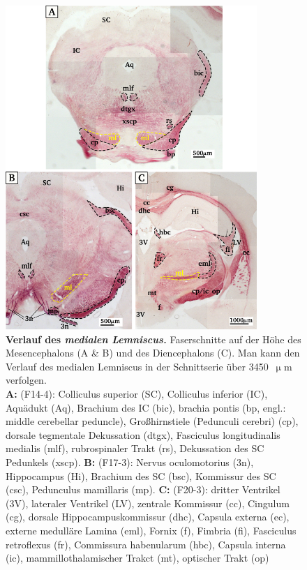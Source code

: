 \begin{figure}[H]
    \centering
    \includegraphics[width = 0.85\textwidth] {pictures/somatosensory/medial_lemniscus.png}
    \caption[Verlauf des medialen Lemniscus]{\small{\textbf{Verlauf des \textit{medialen Lemniscus.}} Faserschnitte auf der Höhe des Mesencephalons (A \& B) und des Diencephalons (C). Man kann den Verlauf des medialen Lemniscus in der Schnittserie über 3450~$\upmu$m verfolgen.\\
    \textbf{A:} (F14-4): Colliculus superior (SC), Colliculus inferior (IC), Aquädukt (Aq), Brachium des IC (bic), brachia pontis (bp, engl.: middle cerebellar peduncle), Großhirnstiele (Pedunculi cerebri) (cp), dorsale tegmentale Dekussation (dtgx), Fasciculus longitudinalis medialis (mlf), rubrospinaler Trakt (rs), Dekussation des SC Pedunkels (xscp).
    \textbf{B:} (F17-3): Nervus oculomotorius (3n), Hippocampus (Hi), Brachium des SC (bsc), Kommissur des SC (csc), Pedunculus mamillaris (mp).
    \textbf{C:} (F20-3): dritter Ventrikel (3V), lateraler Ventrikel (LV), zentrale Kommissur (cc), Cingulum (cg), dorsale Hippocampuskommissur (dhc), Capsula externa (ec), externe medulläre Lamina (eml), Fornix (f), Fimbria (fi), Fasciculus retroflexus (fr), Commissura habenularum (hbc), Capsula interna (ic), mammillothalamischer Trakct (mt), optischer Trakt (op)}}
    \label{fig:medialer_lemniscus}
\end{figure}

